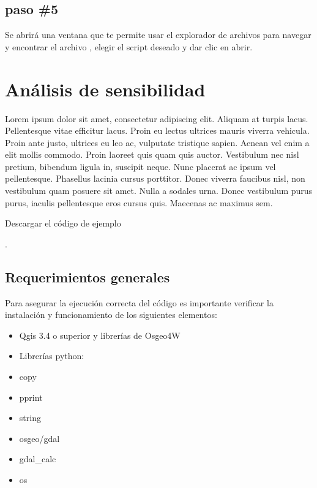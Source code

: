 \documentclass[letterpaper,10pt,spanish]{sphinxmanual}
\begin{document}
\section{paso \#5}
\label{\detokenize{ejecucion:paso-5}}
Se abrirá una ventana que te permite usar el explorador de archivos
para navegar y encontrar el archivo , elegir el script deseado y
dar clic en abrir.

\noindent{}


\chapter{Análisis de sensibilidad}
\label{\detokenize{analisis:analisis-de-sensibilidad}}\label{\detokenize{analisis::doc}}
Lorem ipsum dolor sit amet, consectetur adipiscing elit.
Aliquam at turpis lacus. Pellentesque vitae efficitur lacus.
Proin eu lectus ultrices mauris viverra vehicula. Proin ante justo,
ultrices eu leo ac, vulputate tristique sapien. Aenean vel enim a elit mollis commodo.
Proin laoreet quis quam quis auctor. Vestibulum nec nisl pretium, bibendum ligula in,
suscipit neque. Nunc placerat ac ipsum vel pellentesque. Phasellus lacinia cursus porttitor.
Donec viverra faucibus nisl, non vestibulum quam posuere sit amet. Nulla a sodales urna.
Donec vestibulum purus purus, iaculis pellentesque eros cursus quis. Maecenas ac maximus sem.

Descargar el código de ejemplo

.


\section{Requerimientos generales}
\label{\detokenize{analisis:requerimientos-generales}}
Para asegurar la ejecución correcta del código es importante
verificar la instalación y funcionamiento de los siguientes elementos:
\begin{itemize}
\item {} 
Qgis 3.4 o superior y librerías de Osgeo4W

\item {} 
Librerías python:

\end{itemize}
\begin{itemize}
\item {} 
copy

\item {} 
pprint

\item {} 
string

\item {} 
osgeo/gdal

\item {} 
gdal\_calc

\item {} 
os

\end{itemize}
\end{document}
